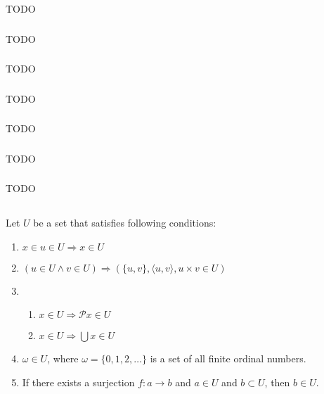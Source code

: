 \documentclass{article}
\begin{document}
TODO

\subsubsection{}

TODO

\subsubsection{}

TODO

\subsubsection{}

TODO

\subsubsection{}

TODO

\subsubsection{}

TODO

\subsubsection{}

TODO

\subsection{}

Let $U$ be a set that satisfies following conditions:

\begin{enumerate}[label=(\roman*)]
\item $x \in u \in U \Rightarrow x \in U$
\item $(u \in U \wedge v \in U) \Rightarrow (\{u, v\}, \langle u, v \rangle, u \times v \in U)$
\item \begin{enumerate}[label=(\arabic*)]
\item $x \in U \Rightarrow \mathcal{P} x \in U$
\item $x \in U \Rightarrow \bigcup x \in U$
\end{enumerate}
\item $\omega \in U$, where $\omega = \{0,1,2,\dots\}$ is a set of all finite ordinal numbers.
\item If there exists a surjection $f : a \rightarrow b$ and $a \in U$ and $b \subset U$, then $b \in U$.
\end{enumerate}
\end{document}
